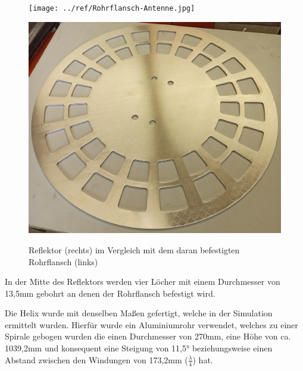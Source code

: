 \begin{figure}[H]
	\begin{minipage}[b]{.4\linewidth} %
		\texttt{[image: ../ref/Rohrflansch-Antenne.jpg]}
		\label{fig:Rohrflansch-Antenne-Verbindung}
	\end{minipage}
	\hspace{.1\linewidth}%
	\begin{minipage}[b]{.4\linewidth} %
		\includegraphics[width=\linewidth]{../ref/Reflektor.jpg}
		\label{fig:Reflektor}
	\end{minipage}
	\caption{Reflektor (rechts) im Vergleich mit dem daran befestigten Rohrflansch (links)}
\end{figure}

In der Mitte des Reflektors werden vier Löcher mit einem Durchmesser von 13,5mm gebohrt an denen der Rohrflansch befestigt wird. 

Die Helix wurde mit denselben Maßen gefertigt, welche in der Simulation ermittelt wurden. Hierfür wurde ein Aluminiumrohr verwendet, welches zu einer Spirale gebogen wurden die einen Durchmesser von 270mm, eine Höhe von ca. 1039,2mm und konsequent eine Steigung von 11,5° beziehungsweise einen Abstand zwischen den Windungen von 173,2mm ($\frac{\lambda}{4}$) hat.

